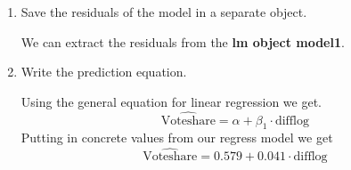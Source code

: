 \documentclass[12pt,letterpaper]{article}
\begin{document}
\begin{enumerate}
		
		\item Save the residuals of the model in a separate object.	\vspace{1cm}
		
		We can extract the residuals from the \textbf{lm object model1}.
		
		
		
		\vspace{2cm}
		\item Write the prediction equation.
		
		Using the general equation for linear regression we get. 
		\[\widehat{\text{Voteshare}} = \alpha + \beta_1 \cdot \text{difflog}\]
		Putting in concrete values from our regress model we get \[\widehat{\text{Voteshare}} = 0.579 + \text{0.041} \cdot \text{difflog} \]
		
	\end{enumerate}
	
\newpage
\end{document}
